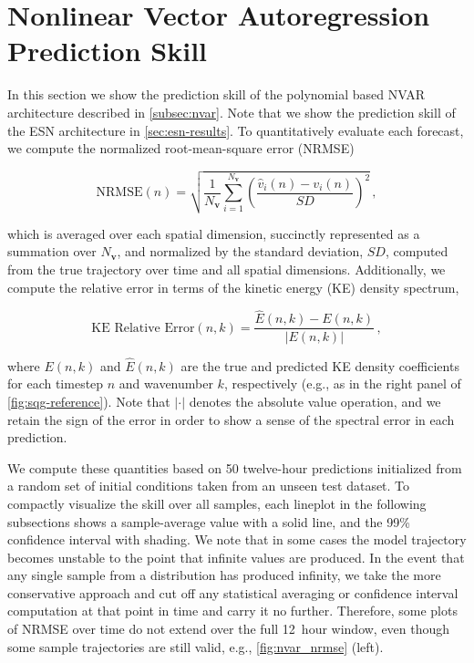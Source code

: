 \documentclass[draft]{agujournal2019}
\newcommand{\state}{\mathbf{v}}
\newcommand{\nstate}{N_{\state}}
\begin{document}
\section{Nonlinear Vector Autoregression Prediction Skill}
\label{sec:nvar-results}

In this section we show the prediction skill of the polynomial based NVAR architecture
described in \cref{subsec:nvar}.
Note that we show the prediction skill of the ESN architecture in
\cref{sec:esn-results}.
To quantitatively evaluate each forecast, we compute
the normalized root-mean-square error (NRMSE)
\begin{linenomath*}\begin{equation}
    \text{NRMSE}(n) = \sqrt{\dfrac{1}{\nstate}\sum_{i=1}^{\nstate}\left(
        \dfrac{\hat{v}_i(n) - v_i(n)}{SD}
        \right)^2 } \, ,
    \label{eq:nrmse}
\end{equation}\end{linenomath*}
which is averaged over each spatial dimension, succinctly represented as a
summation over $\nstate$, and normalized by the standard deviation, $SD$,
computed from the true trajectory over time and all spatial dimensions.
Additionally, we compute the relative error in terms of the kinetic energy
(KE) density spectrum,
\begin{linenomath*}\begin{equation}
    \text{KE Relative Error}(n, k) =
    \dfrac{\hat{E}(n, k) - E(n, k)}{|E(n,k)|} \, ,
    \label{eq:ke_relerr}
\end{equation}\end{linenomath*}
where $E(n,k)$ and $\hat{E}(n,k)$ are the true and predicted KE density coefficients
for each timestep $n$ and wavenumber $k$, respectively (e.g., as in the right
panel of \cref{fig:sqg-reference}).
Note that $|\cdot|$ denotes the absolute value operation,
and we retain the sign of the error in order to show a sense of the
spectral error in each prediction.

We compute these quantities based on 50 twelve-hour predictions initialized from a random
set of initial conditions taken from an unseen test dataset.
To compactly visualize the skill over all samples, each lineplot in the
following subsections shows a sample-average value with a solid line, and the
99\% confidence interval with shading.
We note that in some cases the model trajectory becomes unstable to the point
that infinite values are produced.
In the event that any single sample from a distribution has produced infinity,
we take the more conservative approach and cut off any statistical averaging or
confidence interval computation at that point in time and carry it no further.
Therefore, some plots of NRMSE over time do not extend over the full 12~hour
window, even though some sample trajectories are still valid, e.g.,
\cref{fig:nvar_nrmse} (left).
\end{document}
